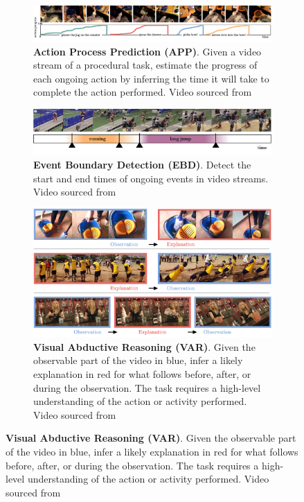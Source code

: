 \begin{figure}[t]
\centering
\begin{subfigure}[b]{\textwidth}
\centering
\includegraphics[width=\textwidth]{figs/states/states-action_progress.pdf}
\caption{\textbf{Action Process Prediction (APP)}. Given a video stream of a procedural task, estimate the progress of each ongoing action by inferring the time it will take to complete the action performed. Video sourced from \citet{grauman2024ego} \vspace{1em}}
\label{fig:states::progress}
\end{subfigure}
\begin{minipage}{0.49\textwidth}
\begin{subfigure}{\linewidth}
\includegraphics[width=\linewidth]{figs/states/states-event_boundary.pdf}
\caption{\textbf{Event Boundary Detection (EBD)}. Detect the start and end times of ongoing events in video streams. Video sourced from \citet{carreira2017quo} \vspace{1em}}
\label{fig:states::boundary}
\end{subfigure}
\hfill
\addtocounter{subfigure}{1}
\begin{subfigure}{\linewidth}
\includegraphics[width=\linewidth]{figs/states/states-abductive reasoning.pdf}
\caption{\textbf{Visual Abductive Reasoning (VAR)}. Given the observable part of the video in \textcolor{babyblue}{blue}, infer a likely explanation in \textcolor{fadedred}{red} for what follows before, after, or during the observation. The task requires a high-level understanding of the action or activity performed. Video sourced from \citet{liang2022visual} \vspace{1em}}

\end{subfigure}
\end{minipage}
\end{figure}
